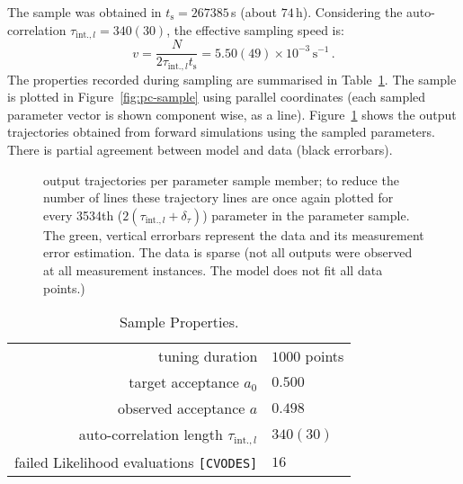 \documentclass[english]{scrartcl}
\begin{document}
The sample was obtained in $t_{\text{s}}=267385$\,s (about
$74$\,h). Considering the auto-correlation
$\tau_{\text{int.},l}=340(30)$, the effective sampling speed is:
\begin{equation}
  \label{eq:speed}
  v=\frac{N}{2\tau_{\text{int.},l} t_{\text{s}}}=5.50(49)\times 10^{-3}\,\text{s}^{-1}\,.
\end{equation}
The properties recorded during sampling are summarised in
Table~\ref{tab:sp}. The sample is plotted in
Figure~\ref{fig:pc-sample} using parallel coordinates (each sampled
parameter vector is shown component wise, as a
line). Figure~\ref{fig:osmpl} shows the output trajectories obtained
from forward simulations using the sampled parameters. There is
partial agreement between model and data (black errorbars).
\begin{figure}
  \sffamily\tiny
  \hspace*{-3cm}
  \caption{output trajectories per parameter sample member;
    to reduce the number of lines these trajectory lines are once
    again plotted for every 3534th
    ($2(\tau_{\text{int.},l}+\delta_\tau)$) parameter in the parameter
    sample. The green, vertical errorbars represent the data and its
    measurement error estimation. The data is sparse (not all outputs
    were observed at all measurement instances. The model does not fit
    all data points.)\label{fig:osmpl}}
\end{figure}

\begin{table}
  \centering
  \begin{tabular}{rl}
    \toprule
    tuning duration& $1000$ points\\
    target acceptance $a_0$&$0.500$\\
    observed acceptance $a$&$0.498$\\
    auto-correlation length $\tau_{\text{int.},l}$&$340(30)$\\
    failed Likelihood evaluations \texttt{[CVODES]}&$16$\\
    \bottomrule
  \end{tabular}
  \caption{Sample Properties.\label{tab:sp}}
\end{table}
\end{document}
